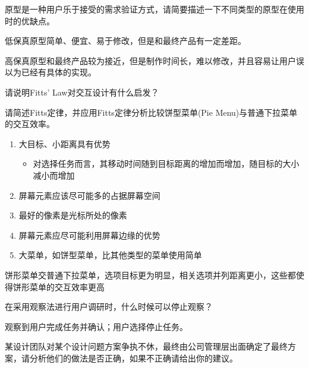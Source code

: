 \begin{problem}[2021]
原型是一种用户乐于接受的需求验证方式，请简要描述一下不同类型的原型在使用时的优缺点。
\end{problem}

\begin{solution}
低保真原型简单、便宜、易于修改，但是和最终产品有一定差距。

高保真原型和最终产品较为接近，但是制作时间长，难以修改，并且容易让用户误以为已经有具体的实现。
\end{solution}



\begin{problem}[2021、2022]
请说明Fitts' Law对交互设计有什么启发？

请简述Fitts定律，并应用Fitts定律分析比较饼型菜单(Pie Menu)与普通下拉菜单的交互效率。
\end{problem}

\begin{solution}
\begin{enumerate}[label=\arabic*.]
    \item 大目标、小距离具有优势
    \vspace{-0.4em}
    \begin{itemize}
        \item 对选择任务而言，其移动时间随到目标距离的增加而增加，随目标的大小减小而增加
    \end{itemize}
    \item 屏幕元素应该尽可能多的占据屏幕空间
    \item 最好的像素是光标所处的像素
    \item 屏幕元素应尽可能利用屏幕边缘的优势
    \item 大菜单，如饼型菜单，比其他类型的菜单使用简单
\end{enumerate}

饼形菜单交普通下拉菜单，选项目标更为明显，相关选项并列距离更小，这些都使得饼形菜单的交互效率更高
\end{solution}



\begin{problem}[2021]
在采用观察法进行用户调研时，什么时候可以停止观察？
\end{problem}

\begin{solution}
观察到用户完成任务并确认；用户选择停止任务。
\end{solution}




\begin{problem}[2021]
某设计团队对某个设计问题方案争执不休，最终由公司管理层出面确定了最终方案，请分析他们的做法是否正确，如果不正确请给出你的建议。
\end{problem}

